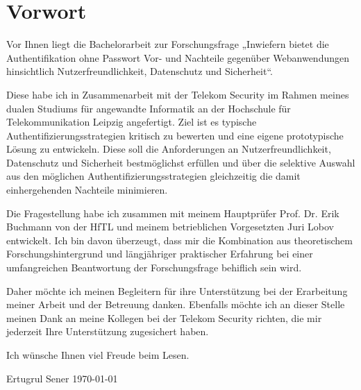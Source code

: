 \chapter{Vorwort}
Vor Ihnen liegt die Bachelorarbeit zur Forschungsfrage „Inwiefern bietet die Authentifikation ohne Passwort Vor- und Nachteile gegenüber Webanwendungen hinsichtlich Nutzerfreundlichkeit, Datenschutz und Sicherheit“.

Diese habe ich in Zusammenarbeit mit der Telekom Security im Rahmen meines dualen Studiums für angewandte Informatik an der Hochschule für Telekommunikation Leipzig angefertigt. Ziel ist es typische Authentifizierungsstrategien kritisch zu bewerten und eine eigene prototypische Lösung zu entwickeln. Diese soll die Anforderungen an Nutzerfreundlichkeit, Datenschutz und Sicherheit bestmöglichst erfüllen und über die selektive Auswahl aus den möglichen Authentifizierungsstrategien gleichzeitig die damit einhergehenden Nachteile minimieren.

Die Fragestellung habe ich zusammen mit meinem Hauptprüfer Prof. Dr. Erik Buchmann von der HfTL und meinem betrieblichen Vorgesetzten Juri Lobov entwickelt. Ich bin davon überzeugt, dass mir die Kombination aus theoretischem Forschungshintergrund und längjähriger praktischer Erfahrung bei einer umfangreichen Beantwortung der Forschungsfrage behiflich sein wird.

Daher möchte ich meinen Begleitern für ihre Unterstützung bei der Erarbeitung meiner Arbeit und der Betreuung danken. Ebenfalls möchte ich an dieser Stelle meinen Dank an meine Kollegen bei der Telekom Security richten, die mir jederzeit Ihre Unterstützung zugesichert haben.

Ich wünsche Ihnen viel Freude beim Lesen.

Ertugrul Sener
\today
